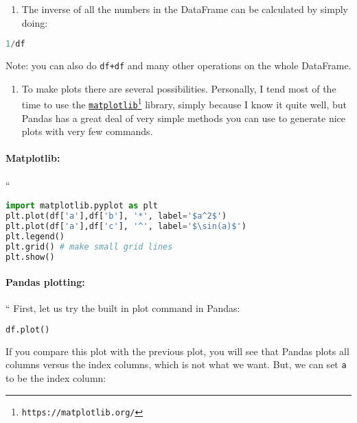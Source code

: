 \documentclass[graybox,sectrefs,envcountresetchap,open=right,final]{svmonodo}
\begin{document}
\begin{enumerate}
\item The inverse of all the numbers in the DataFrame can be calculated by simply doing:
\end{enumerate}

\noindent


\begin{lstlisting}[language=python,style=blue1bar]
1/df

\end{lstlisting}

Note: you can also do \texttt{df+df} and many other operations on the whole DataFrame.

\begin{enumerate}
\item To make plots there are several possibilities. Personally, I tend most of the time to use the  \href{{https://matplotlib.org/}}{\nolinkurl{matplotlib}\footnote{\texttt{https://matplotlib.org/}}} library, simply because I know it quite well, but Pandas has a great deal of very simple methods you can use to generate nice plots with very few commands.
\end{enumerate}

\noindent
\paragraph{Matplotlib:}
``







\begin{lstlisting}[language=python,style=blue1bar]
import matplotlib.pyplot as plt
plt.plot(df['a'],df['b'], '*', label='$a^2$')
plt.plot(df['a'],df['c'], '^', label='$\sin(a)$')
plt.legend() 
plt.grid() # make small grid lines
plt.show()

\end{lstlisting}


\paragraph{Pandas plotting:}
``
First, let us try the built in plot command in Pandas:


\begin{lstlisting}[language=python,style=blue1bar]
df.plot()

\end{lstlisting}

If you compare this plot with the previous plot, you will see that Pandas plots all columns versus the index columns, which is not what we want. But, we can set \texttt{a} to be the index column:
\end{document}
